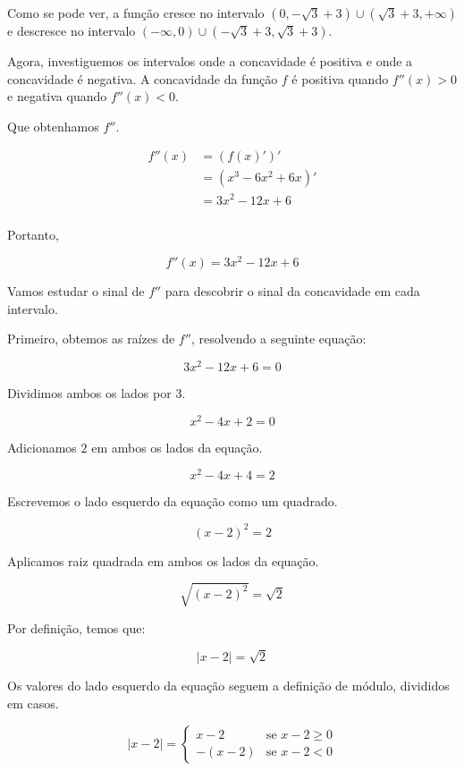 \documentclass{article}
\begin{document}
Como se pode ver, a função cresce no intervalo
\(  (0, -\sqrt{3} + 3) \cup (\sqrt{3} + 3, +\infty)  \)
e descresce no intervalo
\(  (-\infty, 0) \cup (-\sqrt{3} + 3, \sqrt{3} + 3)   \).



Agora, investiguemos os intervalos onde a concavidade é positiva e
onde a concavidade é negativa.
A concavidade da função \(f\) é positiva quando \(f''(x)>0\)
e negativa quando \(f''(x)<0\).

Que obtenhamos \(f''\).

\begin{align*}
    f''(x)
     & = (f(x)')'          \\
     & = (x^{3}-6x^2+ 6x)' \\
     & = 3x^{2}-12x+ 6     \\
\end{align*}

Portanto,

\begin{equation}
    f''(x) = 3x^{2}-12x+ 6
\end{equation}

Vamos estudar o sinal de \(f''\) para descobrir o sinal da
concavidade em cada intervalo.

Primeiro, obtemos as raízes de \(f''\), resolvendo a seguinte equação:

\[
    3x^{2}-12x+ 6 = 0
\]

Dividimos ambos os lados por \(3\).

\[
    x^{2}-4x+ 2 = 0
\]

Adicionamos \(2\) em ambos os lados da equação.

\[
    x^{2}-4x+ 4 = 2
\]

Escrevemos o lado esquerdo da equação como um quadrado.

\[
    (x-2)^2 = 2
\]

Aplicamos raiz quadrada em ambos os lados da equação.

\[
    \sqrt{(x-2)^2} = \sqrt{2}
\]

Por definição, temos que:

\[
    |x-2| = \sqrt{2}
\]

Os valores do lado esquerdo da equação seguem a definição de módulo,
divididos em casos.

\begin{equation}
    |x - 2| =
    \left\{
    \begin{array}{ll}
        x - 2    & \mbox{se } x - 2 \geq 0 \\
        -(x - 2) & \mbox{se } x - 2 < 0
    \end{array}
    \right.
\end{equation}
\end{document}
